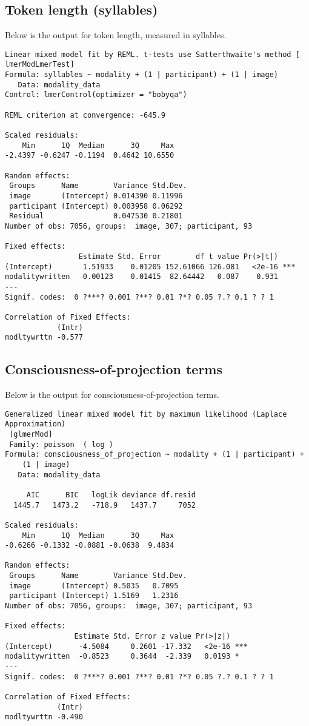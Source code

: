 \documentclass[11pt]{article}
\begin{document}
\subsection{Token length (syllables)}
Below is the output for token length, measured in syllables.
\begin{verbatim}
Linear mixed model fit by REML. t-tests use Satterthwaite's method [
lmerModLmerTest]
Formula: syllables ~ modality + (1 | participant) + (1 | image)
   Data: modality_data
Control: lmerControl(optimizer = "bobyqa")

REML criterion at convergence: -645.9

Scaled residuals: 
    Min      1Q  Median      3Q     Max 
-2.4397 -0.6247 -0.1194  0.4642 10.6550 

Random effects:
 Groups      Name        Variance Std.Dev.
 image       (Intercept) 0.014390 0.11996 
 participant (Intercept) 0.003958 0.06292 
 Residual                0.047530 0.21801 
Number of obs: 7056, groups:  image, 307; participant, 93

Fixed effects:
                 Estimate Std. Error        df t value Pr(>|t|)    
(Intercept)       1.51933    0.01205 152.61066 126.081   <2e-16 ***
modalitywritten   0.00123    0.01415  82.64442   0.087    0.931    
---
Signif. codes:  0 ?***? 0.001 ?**? 0.01 ?*? 0.05 ?.? 0.1 ? ? 1

Correlation of Fixed Effects:
            (Intr)
modltywrttn -0.577
\end{verbatim}

\subsection{Consciousness-of-projection terms}
Below is the output for consciousness-of-projection terms.
\begin{verbatim}
Generalized linear mixed model fit by maximum likelihood (Laplace  Approximation)
 [glmerMod]
 Family: poisson  ( log )
Formula: consciousness_of_projection ~ modality + (1 | participant) +  
    (1 | image)
   Data: modality_data

     AIC      BIC   logLik deviance df.resid 
  1445.7   1473.2   -718.9   1437.7     7052 

Scaled residuals: 
    Min      1Q  Median      3Q     Max 
-0.6266 -0.1332 -0.0881 -0.0638  9.4834 

Random effects:
 Groups      Name        Variance Std.Dev.
 image       (Intercept) 0.5035   0.7095  
 participant (Intercept) 1.5169   1.2316  
Number of obs: 7056, groups:  image, 307; participant, 93

Fixed effects:
                Estimate Std. Error z value Pr(>|z|)    
(Intercept)      -4.5084     0.2601 -17.332   <2e-16 ***
modalitywritten  -0.8523     0.3644  -2.339   0.0193 *  
---
Signif. codes:  0 ?***? 0.001 ?**? 0.01 ?*? 0.05 ?.? 0.1 ? ? 1

Correlation of Fixed Effects:
            (Intr)
modltywrttn -0.490
\end{verbatim}
\end{document}
